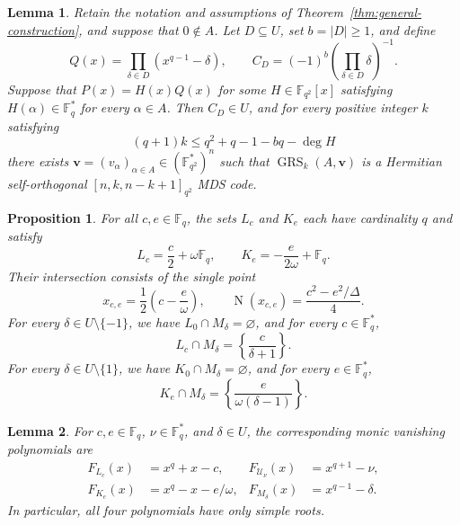 \documentclass[10pt,a4paper]{amsart}
\newtheorem{lemma}{Lemma}
\newtheorem{proposition}{Proposition}
\newcommand{\GRS}{\operatorname{GRS}}
\newcommand{\N}{\operatorname{N}}
\begin{document}
\begin{lemma}\label{lem:q-power-calculation}
Retain the notation and assumptions of Theorem~\ref{thm:general-construction}, and suppose that $0\notin A$. Let $D\subseteq U$, set $b=|D|\ge1$, and define
\[
 Q(x)=\prod_{\delta\in D}(x^{q-1}-\delta),
 \qquad C_D=(-1)^b\left(\prod_{\delta\in D}\delta\right)^{-1}.
\]
Suppose that $P(x)=H(x)Q(x)$ for some $H\in\mathbb F_{q^2}[x]$ satisfying $H(\alpha)\in\mathbb F_q^{*}$ for every $\alpha\in A$.
Then $C_D\in U$, and for every positive integer $k$ satisfying
\begin{equation}\label{eq:specialized-degree}
 (q+1)k\le q^2+q-1-bq-\deg H
\end{equation}
there exists $\boldsymbol v=(v_\alpha)_{\alpha\in A}\in(\mathbb F_{q^2}^{*})^n$ such that $\GRS_k(A,\boldsymbol v)$ is a Hermitian self-orthogonal \mbox{$[n,k,n-k+1]_{q^2}$} MDS code.
\end{lemma}

\begin{proposition}\label{prop:intersection-formulas}
For all $c,e\in\mathbb F_q$, the sets $L_c$ and $K_e$ each have cardinality $q$ and satisfy
\[
 L_c=\frac c2+\omega\mathbb F_q,\qquad
 K_e=-\frac{e}{2\omega}+\mathbb F_q.
\]
Their intersection consists of the single point
\[
 x_{c,e}=\frac12\left(c-\frac e\omega\right),
 \qquad \N(x_{c,e})=\frac{c^2-e^2/\Delta}{4}.
\]
For every $\delta\in U\setminus\{-1\}$, we have $L_0\cap M_\delta=\varnothing$, and for every $c\in\mathbb F_q^{*}$,
\[
 L_c\cap M_\delta=\left\{\frac{c}{\delta+1}\right\}.
\]
For every $\delta\in U\setminus\{1\}$, we have $K_0\cap M_\delta=\varnothing$, and for every $e\in\mathbb F_q^{*}$,
\[
 K_e\cap M_\delta=\left\{\frac{e}{\omega(\delta-1)}\right\}.
\]
\end{proposition}

\begin{lemma}\label{lem:basic-vanishing-polynomials}
For $c,e\in\mathbb F_q$, $\nu\in\mathbb F_q^{*}$, and $\delta\in U$, the corresponding monic vanishing polynomials are
\begin{equation}\label{eq:basic-vanishing-polynomials}
\begin{aligned}
 F_{L_c}(x)&=x^q+x-c,&
 F_{\mathcal U_\nu}(x)&=x^{q+1}-\nu,\\
 F_{K_e}(x)&=x^q-x-e/\omega,&
 F_{M_\delta}(x)&=x^{q-1}-\delta.
\end{aligned}
\end{equation}
In particular, all four polynomials have only simple roots.
\end{lemma}
\end{document}

